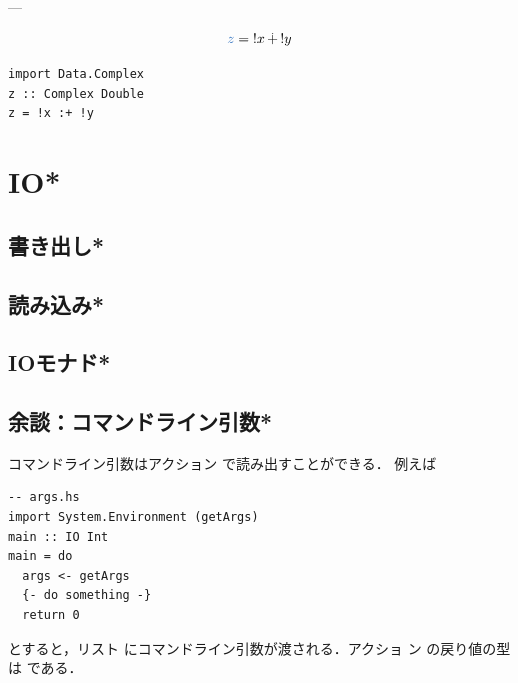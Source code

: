 \documentclass[a5paper,twoside,fleqn,draft]{jsbook}
\begin{document}



---


\begin{equation}
\hVar{z}={}!x{}\mComplexPlus{}!y
\end{equation}

\begin{haskellcode}
\begin{verbatim}
import Data.Complex
z :: Complex Double
z = !x :+ !y
\end{verbatim}
\end{haskellcode}


\chapter{IO*}
\label{ch:more-io}

\section{書き出し*}
\section{読み込み*}
\section{IOモナド*}

\section{余談：コマンドライン引数*}

コマンドライン引数はアクション  で読み出すことができる．
例えば
\begin{haskellcode}
\begin{verbatim}
-- args.hs
import System.Environment (getArgs)
main :: IO Int
main = do
  args <- getArgs
  {- do something -}
  return 0
\end{verbatim}
\end{haskellcode}
とすると，リスト  にコマンドライン引数が渡される．アクショ
ン  の戻り値の型は \code{[String]} である．
\end{document}

